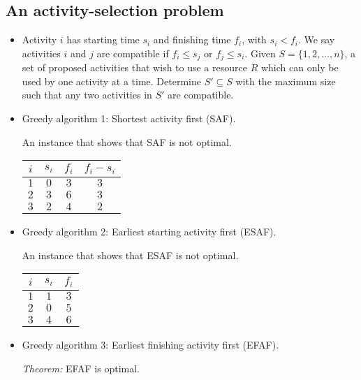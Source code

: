 \documentclass{article}
\begin{document}
\subsection{An activity-selection problem}


\begin{itemize}

\item Activity $i$ has starting time $s_i$ and finishing time $f_i$,
with $s_i<f_i$. We say activities $i$ and $j$ are compatible
if $f_i\le s_j$ or $f_j\le s_i$. Given $S=\{1,2,\ldots,n\}$,
a set of proposed activities that wish to use a resource $R$
which can only be used by one activity at a time. Determine
$S'\subseteq S$ with the maximum size such that any two
activities in $S'$ are compatible.

\item Greedy algorithm 1: Shortest activity first (SAF).

An instance that shows that SAF is not optimal.

\begin{center}
\begin{tabular}{c|cc|c}
$i$ & $s_i$ & $f_i$ & $f_i-s_i$\\\hline
$1$ & $0$ & $3$ & $3$\\
$2$ & $3$ & $6$ & $3$\\
$3$ & $2$ & $4$ & $2$\\
\end{tabular}
\end{center}

\item Greedy algorithm 2: Earliest starting activity first (ESAF).

An instance that shows that ESAF is not optimal.

\begin{center}
\begin{tabular}{c|cc}
$i$ & $s_i$ & $f_i$\\\hline
$1$ & $1$ & $3$\\
$2$ & $0$ & $5$\\
$3$ & $4$ & $6$\\
\end{tabular}
\end{center}

\item Greedy algorithm 3: Earliest finishing activity first (EFAF).

{\em Theorem:} EFAF is optimal.


\end{itemize}
\end{document}
